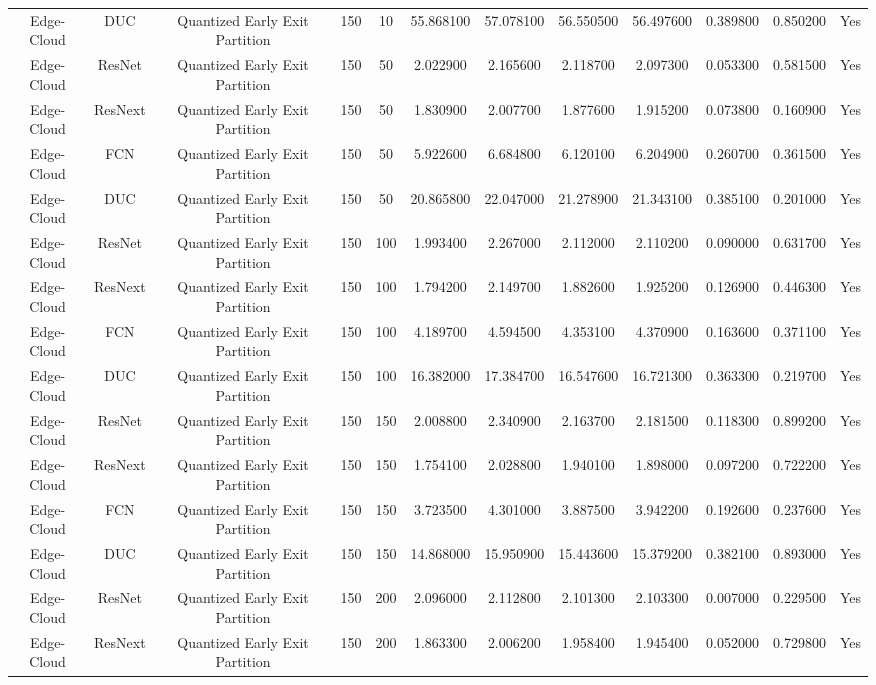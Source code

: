 \begin{tabular}{|c||c||c||c||c||c||c||c||c||c||c||c|}
Edge-Cloud & DUC & Quantized Early Exit Partition & 150 & 10 & 55.868100 & 57.078100 & 56.550500 & 56.497600 & 0.389800 & 0.850200 & Yes \\
Edge-Cloud & ResNet & Quantized Early Exit Partition & 150 & 50 & 2.022900 & 2.165600 & 2.118700 & 2.097300 & 0.053300 & 0.581500 & Yes \\
Edge-Cloud & ResNext & Quantized Early Exit Partition & 150 & 50 & 1.830900 & 2.007700 & 1.877600 & 1.915200 & 0.073800 & 0.160900 & Yes \\
Edge-Cloud & FCN & Quantized Early Exit Partition & 150 & 50 & 5.922600 & 6.684800 & 6.120100 & 6.204900 & 0.260700 & 0.361500 & Yes \\
Edge-Cloud & DUC & Quantized Early Exit Partition & 150 & 50 & 20.865800 & 22.047000 & 21.278900 & 21.343100 & 0.385100 & 0.201000 & Yes \\
Edge-Cloud & ResNet & Quantized Early Exit Partition & 150 & 100 & 1.993400 & 2.267000 & 2.112000 & 2.110200 & 0.090000 & 0.631700 & Yes \\
Edge-Cloud & ResNext & Quantized Early Exit Partition & 150 & 100 & 1.794200 & 2.149700 & 1.882600 & 1.925200 & 0.126900 & 0.446300 & Yes \\
Edge-Cloud & FCN & Quantized Early Exit Partition & 150 & 100 & 4.189700 & 4.594500 & 4.353100 & 4.370900 & 0.163600 & 0.371100 & Yes \\
Edge-Cloud & DUC & Quantized Early Exit Partition & 150 & 100 & 16.382000 & 17.384700 & 16.547600 & 16.721300 & 0.363300 & 0.219700 & Yes \\
Edge-Cloud & ResNet & Quantized Early Exit Partition & 150 & 150 & 2.008800 & 2.340900 & 2.163700 & 2.181500 & 0.118300 & 0.899200 & Yes \\
Edge-Cloud & ResNext & Quantized Early Exit Partition & 150 & 150 & 1.754100 & 2.028800 & 1.940100 & 1.898000 & 0.097200 & 0.722200 & Yes \\
Edge-Cloud & FCN & Quantized Early Exit Partition & 150 & 150 & 3.723500 & 4.301000 & 3.887500 & 3.942200 & 0.192600 & 0.237600 & Yes \\
Edge-Cloud & DUC & Quantized Early Exit Partition & 150 & 150 & 14.868000 & 15.950900 & 15.443600 & 15.379200 & 0.382100 & 0.893000 & Yes \\
Edge-Cloud & ResNet & Quantized Early Exit Partition & 150 & 200 & 2.096000 & 2.112800 & 2.101300 & 2.103300 & 0.007000 & 0.229500 & Yes \\
Edge-Cloud & ResNext & Quantized Early Exit Partition & 150 & 200 & 1.863300 & 2.006200 & 1.958400 & 1.945400 & 0.052000 & 0.729800 & Yes \\

\end{tabular}
